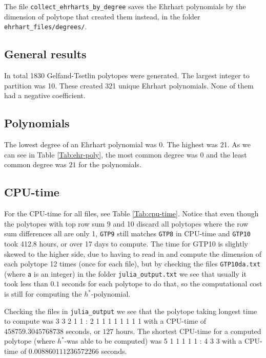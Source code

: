 The file \verb+collect_ehrharts_by_degree+ saves the Ehrhart polynomials by the dimension of polytope that created them instead, in the folder \verb+ehrhart_files/degrees/+.

\subsection{General results}
	
	In total 1830 Gelfand-Tsetlin polytopes were generated. The largest integer to partition was 10. 
	These created 321 unique Ehrhart polynomials. None of them had a negative coefficient. 

\subsection{Polynomials}
	The lowest degree of an Ehrhart polynomial was 0. The highest was 21. As we can see in Table \ref{Tab:ehr-poly}, the most common degree was $0$ and the least common degree was $21$ for the polynomials. 

\subsection{CPU-time} \label{CPU-time} 
For the CPU-time for all files, see Table \ref{Tab:cpu-time}. 
Notice that even though the polytopes with top row sum 9 and 10 discard all polytopes where the row sum differences all are only 1, \verb+GTP9+ still matches \verb+GTP8+ in CPU-time and \verb+GTP10+ took 412.8 hours, or over 17 days to compute. 
The time for GTP10 is slightly skewed to the higher side, due to having to read in and compute the dimension of each polytope 12 times (once for each file), but by checking the files \verb+GTP10da.txt+ (where \verb+a+ is an integer) in the folder \verb+julia_output.txt+ we see that usually it took less than $0.1$ seconds for each polytope to do that, so the computational cost is still for computing the $h^*$-polynomial.

Checking the files in \verb+julia_output+ we see that the polytope taking longest time to compute was 3 3 2 1 1 : 2 1 1 1 1 1 1 1 1 with a CPU-time of $458759.3045768738$ seconds, or $127$ hours. 
The shortest CPU-time for a computed polytope (where $h^*$-was able to be computed) was 5 1 1 1 1 1 : 4 3 3 with a CPU-time of $0.008860111236572266$ seconds. 


